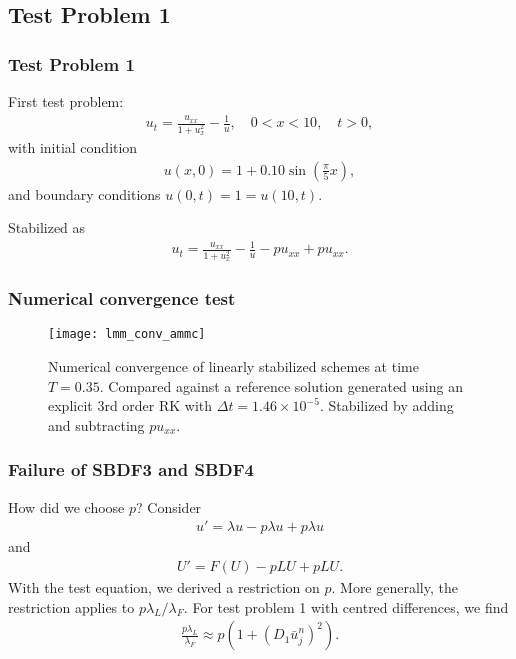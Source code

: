 \documentclass[hyperref={pdfpagelabels=false}]{beamer}
\begin{document}
\subsection{Test Problem 1} 
\begin{frame}
	\frametitle{Test Problem 1} 
First test problem: 
	\begin{align*}
		u_t = \frac{u_{xx}}{1 + u_x^2} - \frac{1}{u}, 
		\quad 0 < x < 10,\quad t > 0, 
	\end{align*}
with initial condition 
	\begin{align*}
		u(x,0) = 1 + 0.10\sin\left(\frac{\pi}{5}x \right),
	\end{align*}
and boundary conditions $u(0,t) = 1 = u(10,t)$.

Stabilized as 
\begin{align*}
u_t = \frac{u_{xx}}{1 + u_x^2} - \frac{1}{u} - pu_{xx} + pu_{xx}.
\end{align*}
\end{frame}

\begin{frame}
	\frametitle{Numerical convergence test}
	\begin{figure}[t]
		\centering
		\texttt{[image: lmm\_conv\_ammc]}
		\caption{Numerical convergence of linearly stabilized schemes at time $T=0.35$. Compared against a reference solution generated using an explicit 3rd order RK with $\Delta t = 1.46\times 10^{-5}$. Stabilized by adding and subtracting $pu_{xx}$.}
	\end{figure}
\end{frame}

\begin{frame}
	\frametitle{Failure of SBDF3 and SBDF4}
How did we choose $p$? Consider 
	\begin{align*}
		u' = \lambda u - p\lambda u + p\lambda u
	\end{align*}
and 
	\begin{align*}
		U' = F(U) - pLU + pLU.
	\end{align*}
With the test equation, we derived a restriction on $p$. More generally, the restriction applies to $p\lambda_L / \lambda_F$. For test problem 1 with centred differences, we find 
	\begin{align*}
		\frac{p\lambda_L}{\lambda_F} 
		\approx p(1 + (D_1 \bar u^n_j)^2).
	\end{align*}
\end{frame}
\end{document}
